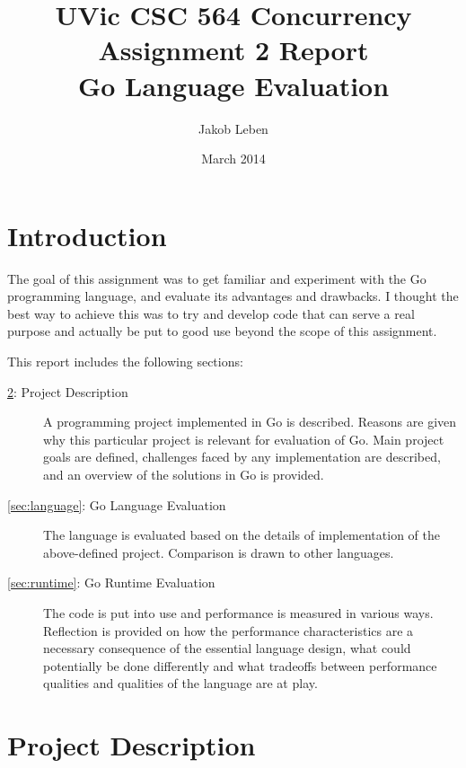 \documentclass {article}
\begin{document}
\title{UVic CSC 564 Concurrency\\Assignment 2 Report\\Go Language Evaluation}
\author{Jakob Leben}
\date{March 2014}
\maketitle


\section{Introduction}

The goal of this assignment was to get familiar and experiment with the Go
programming language, and evaluate its advantages and drawbacks. I thought the
best way to achieve this was to try and develop code that can serve a real
purpose and actually be put to good use beyond the scope of this assignment.

This report includes the following sections:

\begin{description}

\item[\ref{sec:project}: Project Description] A programming project implemented
in Go is described. Reasons are given why this particular project is relevant
for evaluation of Go. Main project goals are defined, challenges faced by any
implementation are described, and an overview of the solutions in Go is
provided.

\item[\ref{sec:language}: Go Language Evaluation] The language is evaluated
based on the details of implementation of the above-defined project. Comparison
is drawn to other languages.

\item[\ref{sec:runtime}: Go Runtime Evaluation] The code is put into use and
performance is measured in various ways. Reflection is provided on how the
performance characteristics are a necessary consequence of the essential
language design, what could potentially be done differently and what tradeoffs
between performance qualities and qualities of the language are at play.

\end{description}

\section{Project Description}
\label{sec:project}
\end{document}
